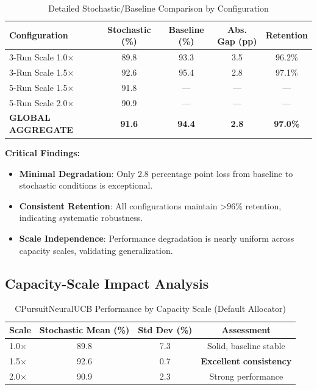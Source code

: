 \documentclass[12pt,a4paper]{article}
\newcommand{\success}[1]{\textcolor{accentgreen}{\textbf{#1}}}
\begin{document}
\begin{table}[H]
\centering
\caption{Detailed Stochastic/Baseline Comparison by Configuration}
\begin{tabular}{@{}lcccc@{}}
\toprule
\textbf{Configuration} & \textbf{Stochastic (\%)} & \textbf{Baseline (\%)} & \textbf{Abs. Gap (pp)} & \textbf{Retention} \\
\midrule
3-Run Scale 1.0$\times$ & 89.8 & 93.3 & 3.5 & 96.2\% \\
3-Run Scale 1.5$\times$ & 92.6 & 95.4 & 2.8 & 97.1\% \\
\midrule
5-Run Scale 1.5$\times$ & 91.8 & --- & --- & --- \\
5-Run Scale 2.0$\times$ & 90.9 & --- & --- & --- \\
\midrule
\textbf{GLOBAL AGGREGATE} & \textbf{91.6} & \textbf{94.4} & \textbf{2.8} & \textbf{97.0\%} \\
\bottomrule
\end{tabular}
\end{table}

\textbf{Critical Findings:}

\begin{itemize}
    \item \success{Minimal Degradation}: Only 2.8 percentage point loss from baseline to stochastic conditions is exceptional.
    
    \item \success{Consistent Retention}: All configurations maintain >96\% retention, indicating systematic robustness.
    
    \item \success{Scale Independence}: Performance degradation is nearly uniform across capacity scales, validating generalization.
\end{itemize}

\subsection{Capacity-Scale Impact Analysis}

\begin{table}[H]
\centering
\caption{CPursuitNeuralUCB Performance by Capacity Scale (Default Allocator)}
\begin{tabular}{@{}lccc@{}}
\toprule
\textbf{Scale} & \textbf{Stochastic Mean (\%)} & \textbf{Std Dev (\%)} & \textbf{Assessment} \\
\midrule
1.0$\times$ & 89.8 & 7.3 & Solid, baseline stable \\
1.5$\times$ & 92.6 & 0.7 & \success{Excellent} \success{consistency} \\
2.0$\times$ & 90.9 & 2.3 & Strong performance \\
\bottomrule
\end{tabular}
\end{table}
\end{document}
